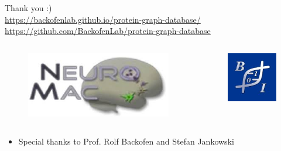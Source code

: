 \documentclass{beamer}
\begin{document}
\begin{frame}
\centering
\huge{Thank you :)}
\bigskip \\
\small{
    \href{https://backofenlab.github.io/protein-graph-database/}{https://backofenlab.github.io/protein-graph-database/} \\
    \href{https://github.com/BackofenLab/protein-graph-database}{https://github.com/BackofenLab/protein-graph-database}
}

\begin{columns}
\begin{column}{0.6\textwidth}
   \begin{figure}
    \centering
    \includegraphics[width=0.6\linewidth]{neuromac.jpeg}
    \end{figure}
\end{column}
\begin{column}{0.4\textwidth}  %
\begin{figure}
    \centering
    \includegraphics[width=0.5\linewidth]{bioinf-fr-logo-blau.jpg}
\end{figure}
\end{column}
\end{columns}
\vfill
\begin{itemize}
    \item Special thanks to Prof. Rolf Backofen and Stefan Jankowski 
\end{itemize}
\end{frame}
\end{document}
